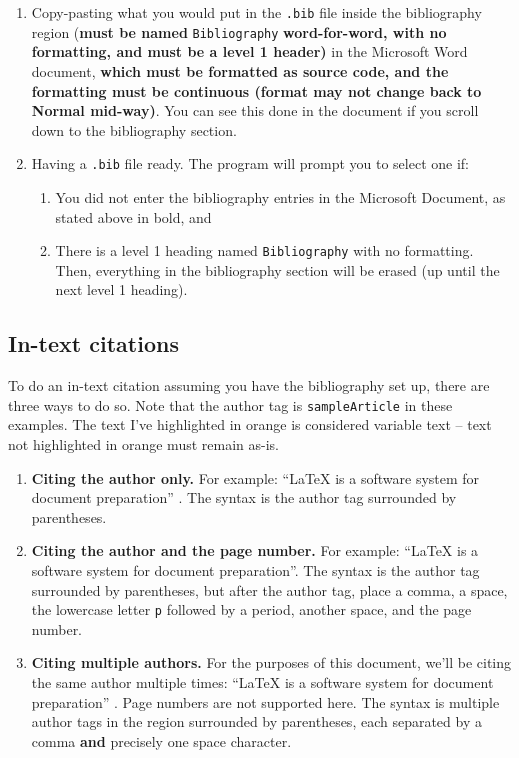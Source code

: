 \documentclass[12pt]{article}
\theoremstyle{plain}
\theoremstyle{remark}
\theoremstyle{definition}
\begin{document}
\begin{enumerate}
\def\labelenumi{\arabic{enumi}.}
\item
  Copy-pasting what you would put in the \texttt{.bib} file inside the
  bibliography region (\textbf{must be named} \texttt{Bibliography}
  \textbf{word-for-word, with no formatting, and must be a level 1
  header)} in the Microsoft Word document, \textbf{which must be
  formatted as source code, and the formatting must be continuous
  (format may not change back to Normal mid-way)}. You can see this done
  in the document if you scroll down to the bibliography section.
\item
  Having a \texttt{.bib} file ready. The program will prompt you to
  select one if:

  \begin{enumerate}
  \def\labelenumii{\alph{enumii}.}
  \item
    You did not enter the bibliography entries in the Microsoft
    Document, as stated above in bold, and
  \item
    There is a level 1 heading named \texttt{Bibliography} with no
    formatting. Then, everything in the bibliography section will be
    erased (up until the next level 1 heading).
  \end{enumerate}
\end{enumerate}


\subsection{In-text citations}

To do an in-text citation assuming you have the bibliography set up,
there are three ways to do so. Note that the author tag is
\texttt{sampleArticle} in these examples. The text I've highlighted in
orange is considered variable text -- text not highlighted in orange
must remain as-is.

\begin{enumerate}
\def\labelenumi{\arabic{enumi}.}
\item
  \textbf{Citing the author only.} For example: ``LaTeX is a software
  system for document preparation'' \cite{sampleArticle}. The syntax is the
  author tag surrounded by parentheses.
\item
  \textbf{Citing the author and the page number.} For example: ``LaTeX
  is a software system for document preparation''\cite[1]{sampleArticle}.
  The syntax is the author tag surrounded by parentheses, but after the
  author tag, place a comma, a space, the lowercase letter \texttt{p}
  followed by a period, another space, and the page number.
\item
  \textbf{Citing multiple authors.} For the purposes of this document,
  we'll be citing the same author multiple times: ``LaTeX is a software
  system for document preparation'' \cite{sampleArticle,sampleArticle}. Page numbers are not supported here. The syntax is
  multiple author tags in the region surrounded by parentheses, each
  separated by a comma \textbf{and} precisely one space character.
\end{enumerate}
\end{document}
